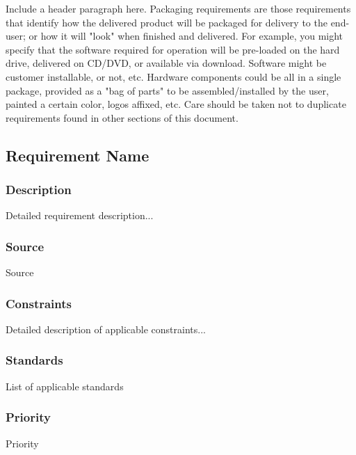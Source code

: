 Include a header paragraph here. Packaging requirements are those requirements that 
identify how the delivered product will be packaged for delivery to the end-user; or 
how it will "look" when finished and delivered. For example, you might specify that 
the software required for operation will be pre-loaded on the hard drive, delivered on 
CD/DVD, or available via download. Software might be customer installable, or not, etc. 
Hardware components could be all in a single package, provided as a "bag of parts" to 
be assembled/installed by the user, painted a certain color, logos affixed, etc. Care 
should be taken not to duplicate requirements found in other sections of this document.

\subsection{Requirement Name}
\subsubsection{Description}
Detailed requirement description...
\subsubsection{Source}
Source
\subsubsection{Constraints}
Detailed description of applicable constraints...
\subsubsection{Standards}
List of applicable standards
\subsubsection{Priority}
Priority